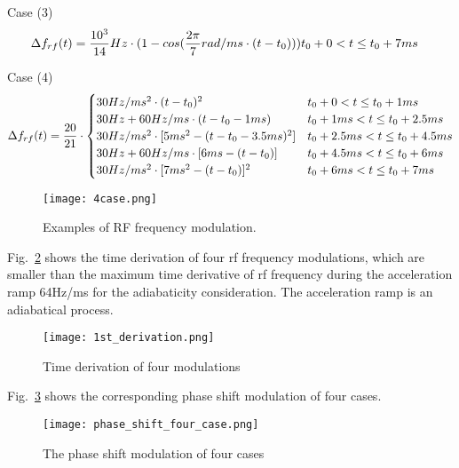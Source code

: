 Case (3) 
\begin{eqnarray}\Delta f_{rf}(t)=
\frac{10^3}{14}Hz \cdot (1-cos(\frac{2\pi}{7} rad/ms\cdot (t-t_0))) &t_0+0<t\le t_0+7ms\cr  
\end{eqnarray}

Case (4) 
\begin{eqnarray}\Delta f_{rf}(t)= \frac{20}{21}\cdot
\begin{cases}
30Hz/ms^2 \cdot (t-t_0)^2 &t_0+0<t\le t_0+1ms\cr  
30Hz + 60Hz/ms\cdot (t-t_0 -1ms) &t_0+1ms<t\le t_0+2.5ms\cr 
30Hz/ms^2 \cdot [5ms^2-(t-t_0-3.5ms)^2] &t_0+2.5ms<t\le t_0+4.5ms\cr  
30Hz + 60Hz/ms\cdot [6ms-(t-t_0)] &t_0+4.5ms<t\le t_0+6ms\cr  
30Hz/ms^2 \cdot [7ms^2-(t-t_0)]^2 &t_0+6ms<t\le t_0+7ms\cr  
\end{cases}
\end{eqnarray}

\begin{figure}[H]
   \centering   
   \texttt{[image: 4case.png]}
   \caption{Examples of RF frequency modulation.}
   \label{4case}
\end{figure}
Fig.~\ref{1st_derivation} shows the time derivation of four rf frequency modulations, which are smaller than the maximum time derivative of rf frequency during the acceleration ramp 64Hz/ms for the adiabaticity consideration. The acceleration ramp is an adiabatical process.
\begin{figure}[H]
   \centering   
   \texttt{[image: 1st\_derivation.png]}
   \caption{Time derivation of four modulations}
   \label{1st_derivation}
\end{figure}

Fig.~\ref{phase_shift_four_case} shows the corresponding phase shift modulation of four cases. 
\begin{figure}[H]
   \centering   
   \texttt{[image: phase\_shift\_four\_case.png]}
   \caption{The phase shift modulation of four cases}
   \label{phase_shift_four_case}
\end{figure}

